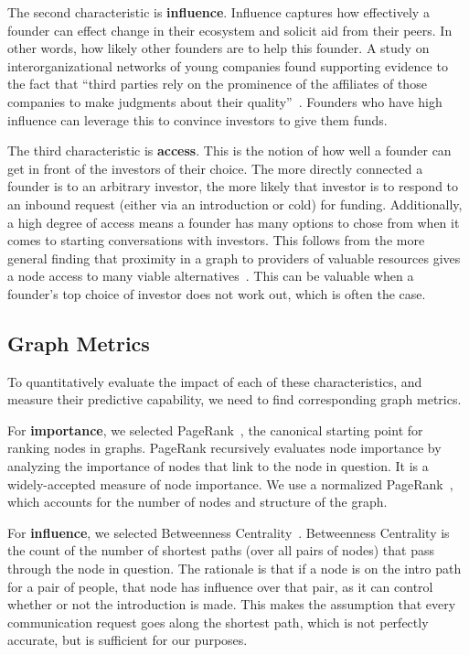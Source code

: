 The second characteristic is \textbf{influence}. Influence captures how effectively a founder can effect change in their ecosystem and solicit aid from their peers. In other words, how likely other founders are to help this founder. A study on interorganizational networks of young companies found supporting evidence to the fact that ``third parties rely on the prominence of the affiliates of those companies to make judgments about their quality''~\cite{10.2307/2666998}. Founders who have high influence can leverage this to convince investors to give them funds.

The third characteristic is \textbf{access}. This is the notion of how well a founder can get in front of the investors of their choice. The more directly connected a founder is to an arbitrary investor, the more likely that investor is to respond to an inbound request (either via an introduction or cold) for funding. Additionally, a high degree of access means a founder has many options to chose from when it comes to starting conversations with investors. This follows from the more general finding that proximity in a graph to providers of valuable resources gives a node access to many viable alternatives~\cite{10.2307/3069443}. This can be valuable when a founder's top choice of investor does not work out, which is often the case.

\subsection{Graph Metrics}

To quantitatively evaluate the impact of each of these characteristics, and measure their predictive capability, we need to find corresponding graph metrics.

For \textbf{importance}, we selected PageRank~\cite{page1999pagerank}, the canonical starting point for ranking nodes in graphs. PageRank recursively evaluates node importance by analyzing the importance of nodes that link to the node in question. It is a widely-accepted measure of node importance. We use a normalized PageRank~\cite{berberich2007comparing}, which accounts for the number of nodes and structure of the graph.

For \textbf{influence}, we selected Betweenness Centrality~\cite{10.2307/3033543}. Betweenness Centrality is the count of the number of shortest paths (over all pairs of nodes) that pass through the node in question. The rationale is that if a node is on the intro path for a pair of people, that node has influence over that pair, as it can control whether or not the introduction is made. This makes the assumption that every communication request goes along the shortest path, which is not perfectly accurate, but is sufficient for our purposes.

